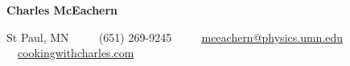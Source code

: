 \begin{center}
    {\Huge \textbf{Charles McEachern}}

    \vspace{7px}

    St Paul, MN
    \ \ \textbullet
    \ \ (651) 269-9245
    \ \ \textbullet
    \ \ \href{mailto:mceachern@physics.umn.edu}{mceachern@physics.umn.edu}
    \ \ \textbullet
    \ \ \href{www.cookingwithcharles.com}{cookingwithcharles.com}

%
\end{center}
